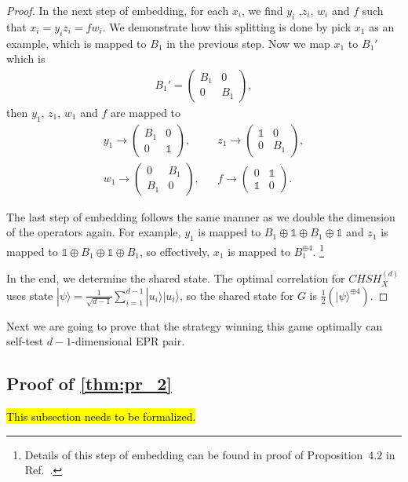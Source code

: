 \documentclass[11pt,letterpaper]{article}
\newcommand{\ket}[1]{|#1\rangle}
\newcommand{\1}{\mathbb{1}}
\newcommand{\CHSH}{CHSH^{(d)}}
\newcommand{\G}{G}
\theoremstyle{definition}
\begin{document}
\begin{proof}
In the next step of embedding, for each $x_i$, we find $y_i$ ,$z_i$, $w_i$ and $f$ such that
$x_i = y_iz_i = fw_i$. We demonstrate how this splitting is done by pick $x_1$ as an example, 
which is mapped to $B_1$ in the previous step. Now we map $x_1$ to $B_1'$ which is
\begin{align}
	B_1' = \begin{pmatrix}
	B_1 & 0 \\
	0 & B_1
	\end{pmatrix},
\end{align}
then $y_1$, $z_1$, $w_1$ and $f$ are mapped to
\begin{align}
y_1 \to 
\begin{pmatrix}
B_1 & 0\\
0 & \1
\end{pmatrix},
&&
z_1 \to
\begin{pmatrix}
\1 & 0\\
0 & B_1
\end{pmatrix},
\\
w_1 \to 
\begin{pmatrix}
0 & B_1\\
B_1 & 0
\end{pmatrix},
&&
f \to
\begin{pmatrix}
0 & \1\\
\1 & 0
\end{pmatrix}.
\end{align}

The last step of embedding follows the same manner as we double the dimension of the operators again.
For example, $y_1$ is mapped to $B_1 \oplus \1 \oplus B_1 \oplus \1$ and $z_1$ is mapped to 
$\1 \oplus B_1 \oplus \1 \oplus B_1$, so effectively, $x_1$ is mapped to $B_1^{\oplus 4}$.
\footnote{Details of this step of embedding can be found in proof of Proposition~$4.2$ in Ref.~\cite{slofstra2017}.}

In the end, we determine the shared state.
The optimal correlation for $\CHSH_X$ uses state 
$\ket{\psi} = \frac{1}{\sqrt{d-1}} \sum_{i=1}^{d-1} \ket{u_i}\ket{u_i}$, 
so the shared state for $\G$ is $\frac{1}{2}( \ket{\psi}^{\oplus 4})$.
\end{proof}
Next we are going to prove that the strategy winning this game optimally can self-test $d-1$-dimensional EPR pair.

\subsection{Proof of \cref{thm:pr_2}}
\hl{This subsection needs to be formalized.}
\end{document}

